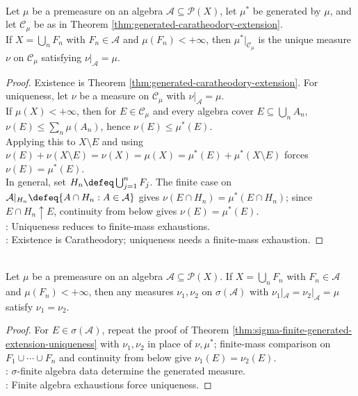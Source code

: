 \begin{theorem} \label{thm:sigma-finite-generated-extension-uniqueness} \\
Let $\mu$ be a premeasure on an algebra $\mathcal{A}\subseteq\mathcal{P}(X)$, let $\mu^\ast$ be generated by $\mu$, and let $\mathcal{C}_\mu$ be as in Theorem \ref{thm:generated-caratheodory-extension}.\\
If $X=\bigcup_nF_n$ with $F_n\in\mathcal{A}$ and $\mu(F_n)<+\infty$, then $\mu^\ast|_{\mathcal{C}_\mu}$ is the unique measure $\nu$ on $\mathcal{C}_\mu$ satisfying $\nu|_{\mathcal{A}}=\mu$.
\begin{proof}
Existence is Theorem \ref{thm:generated-caratheodory-extension}. For uniqueness, let $\nu$ be a measure on $\mathcal{C}_\mu$ with $\nu|_{\mathcal{A}}=\mu$.\\
If $\mu(X)<+\infty$, then for $E\in\mathcal{C}_\mu$ and every algebra cover $E\subseteq\bigcup_nA_n$, $\nu(E)\leq\sum_n\mu(A_n)$, hence $\nu(E)\leq\mu^\ast(E)$.\\
Applying this to $X\setminus E$ and using $\nu(E)+\nu(X\setminus E)=\nu(X)=\mu(X)=\mu^\ast(E)+\mu^\ast(X\setminus E)$ forces $\nu(E)=\mu^\ast(E)$.\\
In general, set $H_n\defeq\bigcup_{j=1}^{n}F_j$. The finite case on $\mathcal{A}|_{H_n}\defeq\{A\cap H_n:A\in\mathcal{A}\}$ gives $\nu(E\cap H_n)=\mu^\ast(E\cap H_n)$; since $E\cap H_n\uparrow E$, continuity from below gives $\nu(E)=\mu^\ast(E)$.\\
: Uniqueness reduces to finite-mass exhaustions.\\
: Existence is Caratheodory; uniqueness needs a finite-mass exhaustion.
\end{proof}
\end{theorem}

\begin{corollary} \label{cor:sigma-finite-premeasure-unique-on-generated-sigma-algebra} \\
Let $\mu$ be a premeasure on an algebra $\mathcal{A}\subseteq\mathcal{P}(X)$. If $X=\bigcup_nF_n$ with $F_n\in\mathcal{A}$ and $\mu(F_n)<+\infty$, then any measures $\nu_1,\nu_2$ on $\sigma(\mathcal{A})$ with $\nu_1|_{\mathcal{A}}=\nu_2|_{\mathcal{A}}=\mu$ satisfy $\nu_1=\nu_2$.
\begin{proof}
For $E\in\sigma(\mathcal{A})$, repeat the proof of Theorem \ref{thm:sigma-finite-generated-extension-uniqueness} with $\nu_1,\nu_2$ in place of $\nu,\mu^\ast$; finite-mass comparison on $F_1\cup\cdots\cup F_n$ and continuity from below give $\nu_1(E)=\nu_2(E)$.\\
: $\sigma$-finite algebra data determine the generated measure.\\
: Finite algebra exhaustions force uniqueness.
\end{proof}
\end{corollary}

